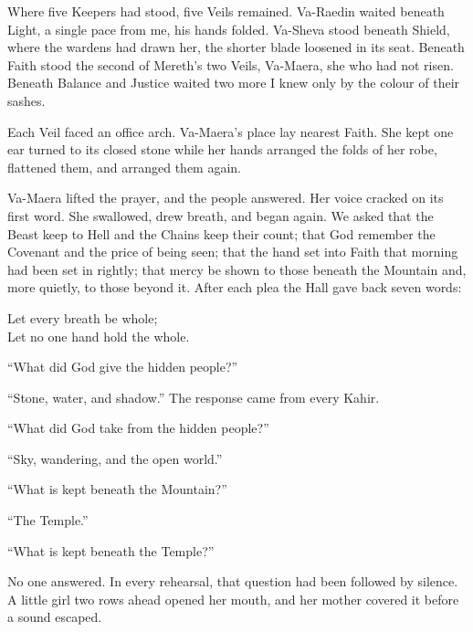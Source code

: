 Where five Keepers had stood, five Veils remained. Va-Raedin waited beneath Light, a single pace from me, his hands folded. Va-Sheva stood beneath Shield, where the wardens had drawn her, the shorter blade loosened in its seat. Beneath Faith stood the second of Mereth's two Veils, Va-Maera, she who had not risen. Beneath Balance and Justice waited two more I knew only by the colour of their sashes.\par

Each Veil faced an office arch. Va-Maera's place lay nearest Faith. She kept one ear turned to its closed stone while her hands arranged the folds of her robe, flattened them, and arranged them again.\par

\ornament

Va-Maera lifted the prayer, and the people answered. Her voice cracked on its first word. She swallowed, drew breath, and began again. We asked that the Beast keep to Hell and the Chains keep their count; that God remember the Covenant and the price of being seen; that the hand set into Faith that morning had been set in rightly; that mercy be shown to those beneath the Mountain and, more quietly, to those beyond it. After each plea the Hall gave back seven words:\par

\begin{scripture}
Let every breath be whole;\\
Let no one hand hold the whole.
\end{scripture}

``What did God give the hidden people?'' \par
``Stone, water, and shadow.'' The response came from every Kahir. \par
``What did God take from the hidden people?'' \par
``Sky, wandering, and the open world.'' \par
``What is kept beneath the Mountain?'' \par
``The Temple.'' \par
``What is kept beneath the Temple?'' \par

No one answered. In every rehearsal, that question had been followed by silence. A little girl two rows ahead opened her mouth, and her mother covered it before a sound escaped.\par

